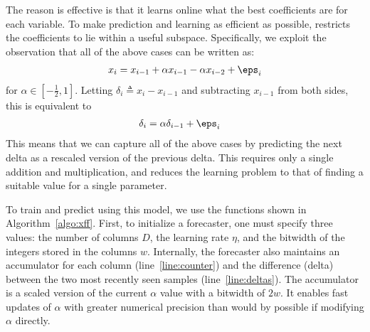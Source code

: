 The reason \fire is effective is that it learns online what the best coefficients are for each variable.
To make prediction and learning as efficient as possible, \justfire \text{} restricts the coefficients to lie within a useful subspace. Specifically, we exploit the observation that all of the above cases can be written as:
\begin{align}
    x_i = x_{i-1} + \alpha x_{i-1} - \alpha x_{i-2} + \eps_i
\end{align}
for $\alpha \in [-\frac{1}{2}, 1]$. Letting $\delta_i \triangleq x_i - x_{i-1}$ and subtracting $x_{i-1}$ from both sides, this is equivalent to
\begin{align}
    \delta_i &= \alpha \delta_{i-1} + \eps_i
\end{align}
This means that we can capture all of the above cases by predicting the next delta as a rescaled version of the previous delta. This requires only a single addition and multiplication, and reduces the learning problem to that of finding a suitable value for a single parameter.


To train and predict using this model, we use the functions shown in Algorithm~\ref{algo:xff}. First, to initialize a \fire forecaster, one must specify three values: the number of columns $D$, the learning rate $\eta$, and the bitwidth of the integers stored in the columns $w$. Internally, the forecaster also maintains an accumulator for each column (line~\ref{line:counter}) and the difference (delta) between the two most recently seen samples (line~\ref{line:deltas}). The accumulator is a scaled version of the current $\alpha$ value with a bitwidth of $2w$. It enables fast updates of $\alpha$ with greater numerical precision than would by possible if modifying $\alpha$ directly. %

